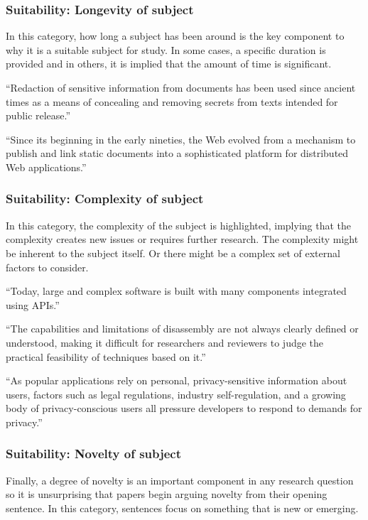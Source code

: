 \documentclass[sigconf]{acmart}
\begin{document}
	\subsubsection{Suitability: Longevity of subject }
	
	In this category, how long a subject has been around is the key component to why it is a suitable subject for study. In some cases, a specific duration is provided and in others, it is implied that the amount of time is significant.
	
	``Redaction of sensitive information from documents has been used since ancient times as a means of concealing and removing secrets from texts intended for public release.''
	
	``Since its beginning in the early nineties, the Web evolved from a mechanism to publish and link static documents into a sophisticated platform for distributed Web applications.''
	
	\subsubsection{Suitability: Complexity of subject}
	
	In this category, the complexity of the subject is highlighted, implying that the complexity creates new issues or requires further research. The complexity might be inherent to the subject itself. Or there might be a complex set of external factors to consider.
	
	``Today, large and complex software is built with many components integrated using APIs.''
	
	``The capabilities and limitations of disassembly are not always clearly defined or understood, making it difficult for researchers and reviewers to judge the practical feasibility of techniques based on it.''
	
	``As popular applications rely on personal, privacy-sensitive information about users, factors such as legal regulations, industry self-regulation, and a growing body of privacy-conscious users all pressure developers to respond to demands for privacy.''
	
	\subsubsection{Suitability: Novelty of subject}
	
	Finally, a degree of novelty is an important component in any research question so it is unsurprising that papers begin arguing novelty from their opening sentence. In this category, sentences focus on something that is new or emerging. 
	
\end{document}
